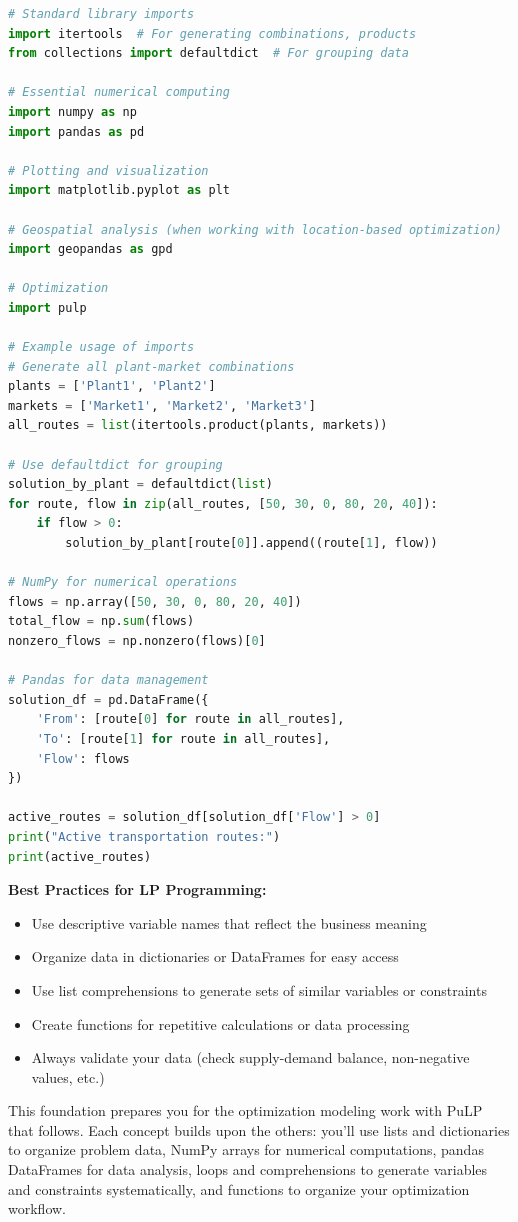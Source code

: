 \begin{lstlisting}[language=Python]
# Standard library imports
import itertools  # For generating combinations, products
from collections import defaultdict  # For grouping data

# Essential numerical computing
import numpy as np
import pandas as pd

# Plotting and visualization
import matplotlib.pyplot as plt

# Geospatial analysis (when working with location-based optimization)
import geopandas as gpd

# Optimization
import pulp

# Example usage of imports
# Generate all plant-market combinations
plants = ['Plant1', 'Plant2']
markets = ['Market1', 'Market2', 'Market3']
all_routes = list(itertools.product(plants, markets))

# Use defaultdict for grouping
solution_by_plant = defaultdict(list)
for route, flow in zip(all_routes, [50, 30, 0, 80, 20, 40]):
    if flow > 0:
        solution_by_plant[route[0]].append((route[1], flow))

# NumPy for numerical operations
flows = np.array([50, 30, 0, 80, 20, 40])
total_flow = np.sum(flows)
nonzero_flows = np.nonzero(flows)[0]

# Pandas for data management
solution_df = pd.DataFrame({
    'From': [route[0] for route in all_routes],
    'To': [route[1] for route in all_routes],
    'Flow': flows
})

active_routes = solution_df[solution_df['Flow'] > 0]
print("Active transportation routes:")
print(active_routes)
\end{lstlisting}

\begin{info}
\textbf{Best Practices for LP Programming:}
\begin{itemize}
\item Use descriptive variable names that reflect the business meaning
\item Organize data in dictionaries or DataFrames for easy access
\item Use list comprehensions to generate sets of similar variables or constraints
\item Create functions for repetitive calculations or data processing
\item Always validate your data (check supply-demand balance, non-negative values, etc.)
\end{itemize}
\end{info}

This foundation prepares you for the optimization modeling work with PuLP that follows. Each concept builds upon the others: you'll use lists and dictionaries to organize problem data, NumPy arrays for numerical computations, pandas DataFrames for data analysis, loops and comprehensions to generate variables and constraints systematically, and functions to organize your optimization workflow.